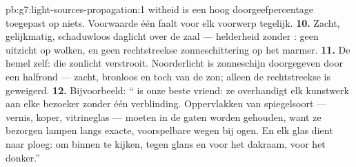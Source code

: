 \begin{solution}{pb:g7:light-sources-propagation:1}
witheid is een hoog doorgeefpercentage toegepast op niets. Voorwaarde
één faalt voor elk voorwerp tegelijk.
\textbf{10.} Zacht, gelijkmatig, schaduwloos daglicht over de zaal ---
helderheid zonder : geen uitzicht op wolken, en geen
rechtstreekse zonneschittering op het marmer.
\textbf{11.} De hemel zelf:  die zonlicht verstrooit.
Noorderlicht is zonneschijn doorgegeven door een halfrond
 --- zacht, bronloos en toch van de zon; alleen de rechtstreekse
 is geweigerd.
\textbf{12.} Bijvoorbeeld: `` is onze beste vriend: ze
overhandigt elk kunstwerk aan elke bezoeker zonder één verblinding.
Oppervlakken van spiegelsoort --- vernis, koper, vitrineglas ---
moeten in de gaten worden gehouden, want ze bezorgen lampen langs
exacte, voorspelbare wegen bij ogen. En elk glas dient naar ploeg:
 om binnen te kijken,  tegen glans en
voor het dakraam,  voor het donker.''
\end{solution}
